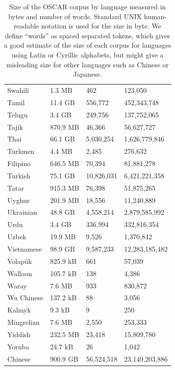 \begin{table}[t!]
\begin{tabular}{llll}
        Swahili           & 1.3 MB    & 462        & 123,050        \\
        Tamil             & 11.4 GB   & 556,772    & 452,343,748    \\
        Telugu            & 3.4 GB    & 249,756    & 137,752,065    \\
        Tajik             & 870.9 MB  & 46,366     & 56,627,727     \\
        Thai              & 66.1 GB   & 5,030,254  & 1,626,779,846  \\
        Turkmen           & 4.4 MB    & 2,485      & 276,632        \\
        Filipino          & 646.5 MB  & 70,394     & 81,881,278     \\
        Turkish           & 75.1 GB   & 10,826,031 & 6,421,221,358  \\
        Tatar             & 915.3 MB  & 76,398     & 51,875,265     \\
        Uyghur            & 201.9 MB  & 18,556     & 11,240,889     \\
        Ukrainian         & 48.8 GB   & 4,558,214  & 2,879,585,992  \\
        Urdu              & 3.4 GB    & 336,994    & 332,816,354    \\
        Uzbek             & 19.9 MB   & 9,526      & 1,370,842      \\
        Vietnamese        & 98.9 GB   & 9,587,233  & 12,283,185,482 \\
        Volapük           & 825.9 kB  & 661        & 57,039         \\
        Walloon           & 105.7 kB  & 138        & 4,386          \\
        Waray             & 7.6 MB    & 933        & 830,872        \\
        Wu Chinese        & 137.2 kB  & 88         & 3,056          \\
        Kalmyk            & 9.3 kB    & 9          & 250            \\
        Mingrelian        & 7.6 MB    & 2,550      & 253,333        \\
        Yiddish           & 232.5 MB  & 23,418     & 15,809,780     \\
        Yoruba            & 24.7 kB   & 26         & 1,042          \\
        Chinese           & 900.9 GB  & 56,524,518 & 23,149,203,886 \\
        \bottomrule
    \end{tabular}
    \caption{Size of the OSCAR corpus by language measured in bytes and number of words. Standard UNIX human-readable notation is used for the size in byte. We define ``words'' as spaced separated tokens, which gives a good estimate of the size of each corpus for languages using Latin or Cyrillic alphabets, but might give a misleading size for other languages such as Chinese or Japanese.}
    \label{tab:langs_towards}
\end{table}